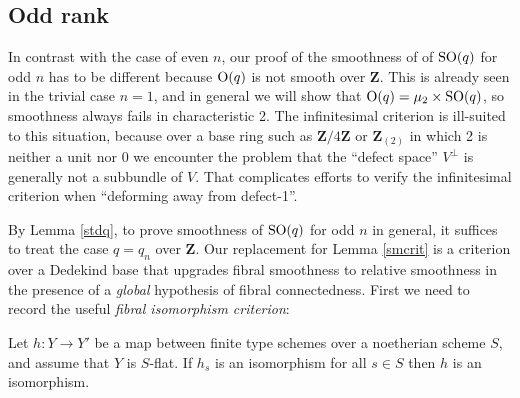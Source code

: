 \documentclass[10pt]{article}
\renewcommand{\(}{\left(}
\renewcommand{\)}{\right)}
\numberwithin{thm}{subsection}
\begin{document}
\subsection{Odd rank}\label{oddrk}

In contrast with the case of even $n$, our proof of the smoothness of 
of ${\rm{SO}}(q)$ for odd $n$ has to be different because
${\rm{O}}(q)$ is not smooth over ${\mathbf{Z}}$. This is already seen
in the trivial case $n = 1$, and in general we will
show that ${\rm{O}}(q) = \mu_2 \times {\rm{SO}}(q)$,
so smoothness always fails in characteristic 2.  
The infinitesimal criterion is ill-suited 
to this situation, because over a base ring
such as ${\mathbf{Z}}/4{\mathbf{Z}}$ or ${\mathbf{Z}}_{(2)}$ in which
2 is neither a unit nor 0 we encounter the problem
that the ``defect space'' $V^{\perp}$ is generally not a subbundle of $V$.
That complicates efforts to verify the infinitesimal criterion
when ``deforming away from defect-1''.

By Lemma \ref{stdq}, to prove smoothness of ${\rm{SO}}(q)$
for odd $n$ in general, it suffices to treat the case $q = q_n$ over ${\mathbf{Z}}$.
Our replacement for Lemma \ref{smcrit} is a
criterion over a Dedekind base that upgrades fibral smoothness to
relative smoothness in the presence of a {\em global} hypothesis
of fibral connectedness.  First we need to record the useful {\em fibral isomorphism criterion}:


\begin{lem}\label{flatclosed} Let $h:Y \rightarrow Y'$ be a map between
finite type schemes over a noetherian scheme $S$, and assume that $Y$ is $S$-flat.
If $h_s$ is an isomorphism for all $s \in S$ then $h$ is an isomorphism.
\end{lem}
\end{document}
